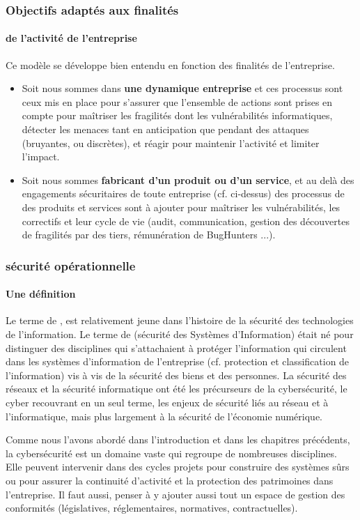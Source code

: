 \begin{frame}
\frametitle<presentation>{Objectifs adaptés aux finalités}
\framesubtitle<presentation>{de l'activité de l'entreprise}
Ce modèle se développe bien entendu en fonction des finalités de l'entreprise.

\begin{itemize}
    \item Soit nous sommes dans \textbf{une dynamique entreprise} et ces processus sont ceux mis en place pour s'assurer que  l'ensemble de actions sont prises en compte pour maîtriser les fragilités dont les vulnérabilités informatiques, détecter les menaces tant en anticipation que pendant des attaques (bruyantes, ou discrètes), et réagir pour maintenir l'activité et limiter l'impact.
    \item  Soit nous sommes \textbf{fabricant d'un produit ou d'un service}, et au delà des engagements sécuritaires de toute entreprise (cf. ci-dessus) des processus de  des produits et services sont à ajouter pour maîtriser les vulnérabilités, les correctifs et leur cycle de vie  (audit, communication, gestion des découvertes de fragilités par des tiers, rémunération de BugHunters ...).
\end{itemize}
\end{frame}

\begin{frame}
\frametitle<presentation>{sécurité opérationnelle}
\framesubtitle<presentation>{Une définition}
 Le terme de , est relativement jeune dans l’histoire de la sécurité des technologies de l’information. Le terme de (sécurité des Systèmes d’Information) était né pour distinguer des disciplines qui s’attachaient à protéger l’information qui circulent dans les systèmes d'information de l’entreprise (cf. protection et classification de l’information) vis à vis de la sécurité des biens et des personnes. La sécurité des réseaux et la sécurité informatique ont été les précurseurs de la cybersécurité, le cyber recouvrant en un seul terme, les enjeux de sécurité liés au réseau et à l’informatique, mais plus largement à la sécurité de l'économie numérique.
\end{frame}

Comme nous l’avons abordé dans l'introduction et dans les chapitres précédents, la cybersécurité est un domaine vaste qui regroupe de nombreuses disciplines. Elle peuvent intervenir dans des cycles projets pour construire des systèmes sûrs ou pour assurer la continuité d’activité et la protection des patrimoines dans l'entreprise. Il faut aussi, penser à y ajouter aussi tout un espace de gestion des conformités (législatives, réglementaires, normatives, contractuelles).


